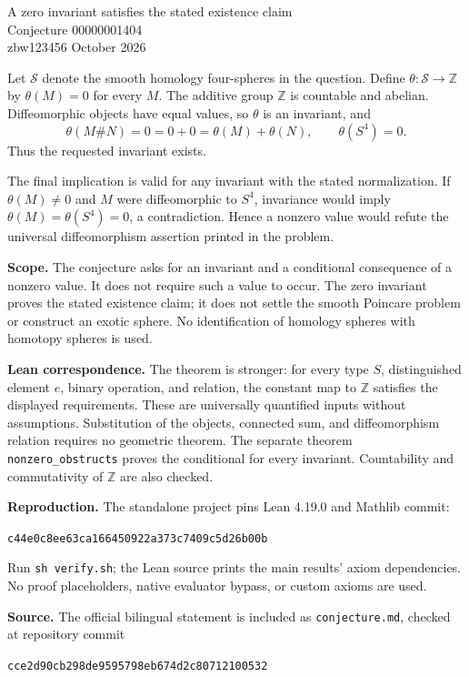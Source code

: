 \documentclass[11pt]{article}
\begin{document}
\begin{center}{\Large A zero invariant satisfies the stated existence claim}\\[6pt]
{\large Conjecture 00000001404}\\[5pt]
zbw123456  October 2026\end{center}

Let $\mathcal S$ denote the smooth homology four-spheres in the question.
Define $\theta:\mathcal S\to\mathbb Z$ by $\theta(M)=0$ for every $M$.
The additive group $\mathbb Z$ is countable and abelian.
Diffeomorphic objects have equal values, so $\theta$ is an invariant, and
\[
\theta(M\#N)=0=0+0=\theta(M)+\theta(N),\qquad \theta(S^4)=0.
\]
Thus the requested invariant exists.

The final implication is valid for any invariant with the stated normalization.
If $\theta(M)\ne0$ and $M$ were diffeomorphic to $S^4$, invariance would imply
$\theta(M)=\theta(S^4)=0$, a contradiction. Hence a nonzero value would refute
the universal diffeomorphism assertion printed in the problem.

\textbf{Scope.} The conjecture asks for an invariant and a conditional
consequence of a nonzero value. It does not require such a value to occur.
The zero invariant proves the stated existence claim; it does not settle
the smooth Poincare problem or construct an exotic sphere. No identification
of homology spheres with homotopy spheres is used.

\textbf{Lean correspondence.} The theorem is stronger: for every type $S$,
distinguished element $e$, binary operation, and relation, the constant map
to $\mathbb Z$ satisfies the displayed requirements. These are universally
quantified inputs without assumptions. Substitution of the objects,
connected sum, and diffeomorphism relation requires no geometric theorem.
The separate theorem \texttt{nonzero\_obstructs} proves the conditional for
every invariant. Countability and commutativity of $\mathbb Z$ are also checked.

\textbf{Reproduction.} The standalone project pins Lean 4.19.0 and Mathlib
commit:
\begin{center}\small\texttt{c44e0c8ee63ca166450922a373c7409c5d26b00b}\end{center}
Run \texttt{sh verify.sh}; the Lean source prints the main results'
axiom dependencies. No proof placeholders, native evaluator bypass, or
custom axioms are used.

\textbf{Source.} The official bilingual statement is included as
\texttt{conjecture.md}, checked at repository commit
\begin{center}\small\texttt{cce2d90cb298de9595798eb674d2c80712100532}\end{center}
\end{document}

